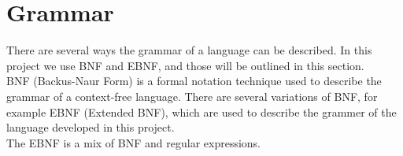 \section{Grammar}
\label{sec:ebnf}

There are several ways the grammar of a language can be described. In this project we use BNF and EBNF, and those will be outlined in this section.\\
BNF (Backus-Naur Form) is a formal notation technique used to describe the grammar of a context-free language. There are several variations of BNF, for example EBNF (Extended BNF), which are used to describe the grammer of the language developed in this project.\\
The EBNF is a mix of BNF and regular expressions.